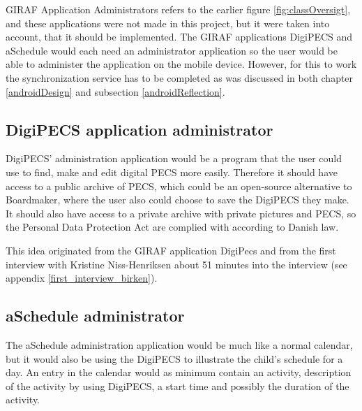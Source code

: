 GIRAF Application Administrators refers to the earlier figure \vref{fig:classOversigt}, and these applications were not made in this project, but it were taken into account, that it should be implemented. The GIRAF applications DigiPECS and aSchedule would each need an administrator application so the user would be able to administer the application on the mobile device. However, for this to work the synchronization service has to be completed as was discussed in both chapter \vref{androidDesign} and subsection \ref{androidReflection}.
   
\subsection{DigiPECS application administrator}
DigiPECS' administration application would be a program that the user could use to find, make and edit digital PECS more easily. Therefore it should have access to a public archive of PECS, which could be an open-source alternative to Boardmaker, where the user also could choose to save the DigiPECS they make. It should also have access to a private archive with private pictures and PECS, so the Personal Data Protection Act are complied with according to Danish law. 

This idea originated from the GIRAF application DigiPecs and from the first interview with Kristine Niss-Henriksen about 51 minutes into the interview (see appendix \vref{first_interview_birken}).

\subsection{aSchedule administrator}
The aSchedule administration application would be much like a normal calendar, but it would also be using the DigiPECS to illustrate the child's schedule for a day. An entry in the calendar would as minimum contain an activity, description of the activity by using DigiPECS, a start time and possibly the duration of the activity.